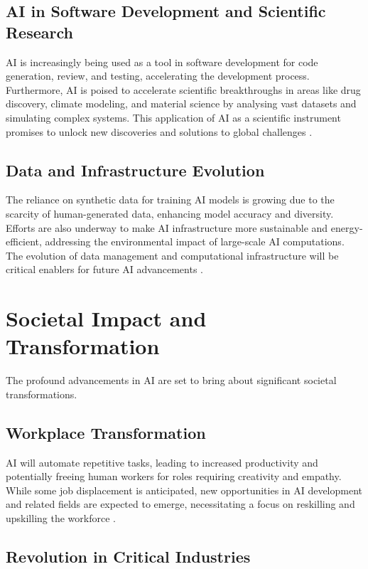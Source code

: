 \subsection{AI in Software Development and Scientific Research}

AI is increasingly being used as a tool in software development for code generation, review, and testing, accelerating the development process. Furthermore, AI is poised to accelerate scientific breakthroughs in areas like drug discovery, climate modeling, and material science by analysing vast datasets and simulating complex systems. This application of AI as a scientific instrument promises to unlock new discoveries and solutions to global challenges \parencite{aiindex2023}.

\subsection{Data and Infrastructure Evolution}

The reliance on synthetic data for training AI models is growing due to the scarcity of human-generated data, enhancing model accuracy and diversity. Efforts are also underway to make AI infrastructure more sustainable and energy-efficient, addressing the environmental impact of large-scale AI computations. The evolution of data management and computational infrastructure will be critical enablers for future AI advancements \parencite{reed2023future}.

\section{Societal Impact and Transformation}

The profound advancements in AI are set to bring about significant societal transformations.

\subsection{Workplace Transformation}

AI will automate repetitive tasks, leading to increased productivity and potentially freeing human workers for roles requiring creativity and empathy. While some job displacement is anticipated, new opportunities in AI development and related fields are expected to emerge, necessitating a focus on reskilling and upskilling the workforce \parencite{aiindex2023}.

\subsection{Revolution in Critical Industries}


